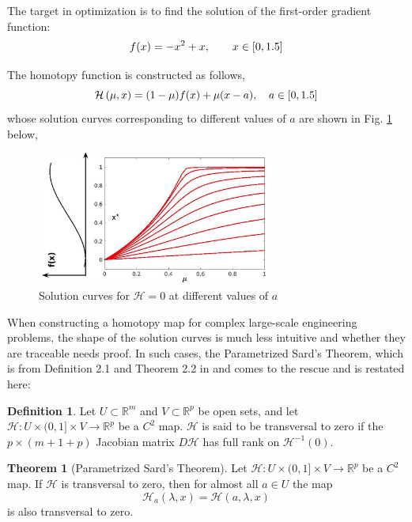 \documentclass{article}
\theoremstyle{definition}
\newtheorem{definition}{Definition}[section]
\newtheorem{theorem}{Theorem}
\begin{document}
The target in optimization is to find the solution of the first-order gradient function:
\begin{equation*}
f(x) = -x^2 + x,  \qquad  x \in [0, 1.5]\\
\end{equation*}

The homotopy function is constructed as follows,
\begin{equation*}
\mathcal{H} \left(\mu, x\right) = (1-\mu) f(x) + \mu (x-a), \quad a \in [0, 1.5] \\
\end{equation*}
whose solution curves corresponding to different values of $a$ are shown in Fig. \ref{fig:zc} below,
\begin{figure}[H]
  \centering
  \includegraphics[width=0.7\textwidth]{./figs/zero_curve.png}
  \caption{Solution curves for $\mathcal{H}=0$ at different values of $a$}
  \label{fig:zc}
\end{figure}

When constructing a homotopy map for complex large-scale engineering problems, the shape of the solution curves is much less intuitive and whether they are traceable needs proof. In such cases, the Parametrized Sard's Theorem, which is from Definition 2.1 and Theorem 2.2 in \cite{watson_2002} and \cite{chow_1978} comes to the rescue and is restated here:

\theoremstyle{definition}
\begin{definition}
Let $U \subset \mathbb{R}^m$ and $V \subset \mathbb{R}^p $ be open sets, and let $\mathcal{H} : U \times (0,1] \times V \rightarrow \mathbb{R}^p $ be a $C^2$ map. $\mathcal{H}$ is said to be transversal to zero if the $p \times (m + 1 + p)$ Jacobian matrix $D\mathcal{H}$ has full rank on $\mathcal{H} ^{-1}(0)$.   
\end{definition}

\begin{theorem}[Parametrized Sard's Theorem]
Let $\mathcal{H} : U \times (0,1] \times V \rightarrow \mathbb{R}^p $ be a $C^2$ map. If $\mathcal{H}$ is transversal to zero, then for almost all $a \in U$ the map 
\begin{equation*}
\mathcal{H}_a(\lambda, x) = \mathcal{H}(a, \lambda, x) 
\end{equation*}
is also transversal to zero.
\end{theorem}
\end{document}

